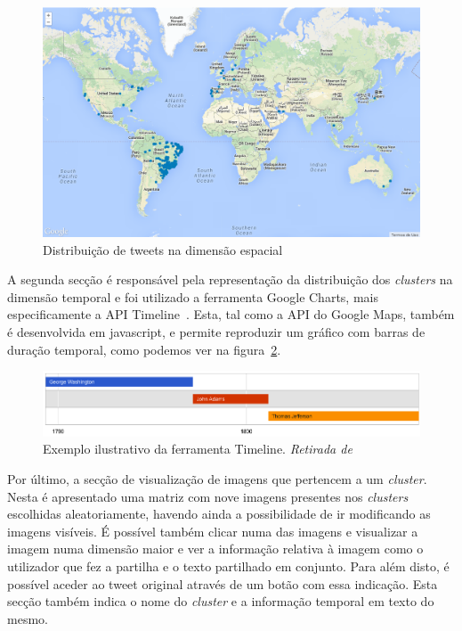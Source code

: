 \begin{figure}[h]
\centering
\includegraphics[width=1.0\linewidth]{./figures/olhopassarinho/map1.png}
\caption{Distribuição de tweets na dimensão espacial}
\label{fig:map1}
\end{figure}

A segunda secção é responsável pela representação da distribuição dos \textit{clusters} na dimensão temporal e foi utilizado a ferramenta Google Charts, mais especificamente a API Timeline~\cite{googletimeline}. Esta, tal como a API do Google Maps, também é desenvolvida em javascript, e permite reproduzir um gráfico com barras de duração temporal, como podemos ver na figura~\ref{fig:timeex}. 

\begin{figure}[h]
\centering
\includegraphics[width=1.0\linewidth]{./figures/olhopassarinho/time_example.png}
\caption{Exemplo ilustrativo da ferramenta Timeline. \textit{Retirada de}~\cite{googletimeline}}
\label{fig:timeex}
\end{figure}

Por último, a secção de visualização de imagens que pertencem a um \textit{cluster}. Nesta é apresentado uma matriz com nove imagens presentes nos \textit{clusters} escolhidas aleatoriamente, havendo ainda a possibilidade de ir modificando as imagens visíveis. É possível também clicar numa das imagens e visualizar a imagem numa dimensão maior e ver a informação relativa à imagem como o utilizador que fez a partilha e o texto partilhado em conjunto. Para além disto, é possível aceder ao tweet original através de um botão com essa indicação. Esta secção também indica o nome do \textit{cluster} e a informação temporal em texto do mesmo.

